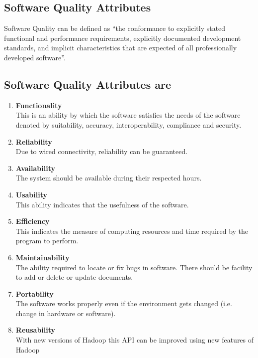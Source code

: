 \subsection{Software Quality Attributes}

Software Quality can be defined as “the conformance to explicitly stated functional and performance requirements, explicitly documented development standards, and implicit characteristics that are expected of all professionally developed software”.\\
	
\subsection{Software Quality Attributes are}

\begin{enumerate}
\item \textbf{Functionality} \\
This is an ability by which the software satisfies the needs of the software denoted by suitability, accuracy, interoperability, compliance and security.

\item \textbf{Reliability} \\
Due to wired connectivity, reliability can be guaranteed.

\item \textbf{Availability} \\
The system should be available during their respected hours.

\item \textbf{Usability} \\
This ability indicates that the usefulness of the software.

\item \textbf{Efficiency} \\
This indicates the measure of computing resources and time required by the program to perform.

\item \textbf{Maintainability} \\
The ability required to locate or fix bugs in software. There should be facility to add or delete or update documents.

\item \textbf{Portability} \\
The software works properly even if the environment gets changed (i.e. change in hardware or software).

\item \textbf{Reusability} \\
With new versions of Hadoop this API can be improved using new features of Hadoop
\end{enumerate}

